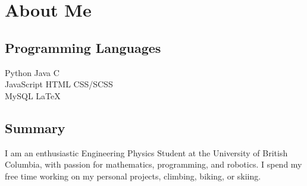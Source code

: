 \documentclass[]{deedy-resume-openfont}
\begin{document}
\section{About Me}
\begin{minipage}[t]{.35\textwidth}
	\subsection{Programming Languages}
	Python \textbullet{} Java \textbullet{} C \\
	JavaScript \textbullet{} HTML \textbullet{} CSS/SCSS \\
	MySQL \textbullet{} \LaTeX
	\sectionsep
\end{minipage}
\hfill
\begin{minipage}[t]{.55\textwidth}
	\subsection{Summary}
	I am an enthusiastic Engineering Physics Student at the University of British Columbia, with passion for mathematics, programming, and robotics. I spend my free time working on my personal projects, climbing, biking, or skiing.

	\vspace{10pt}

\end{minipage}
\end{document}
